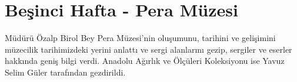 \section{Beşinci Hafta - Pera Müzesi}
\indent\indent Müdürü Özalp Birol Bey Pera Müzesi'nin oluşumunu, tarihini ve gelişimini müzecilik tarihimizdeki yerini anlattı ve sergi alanlarını gezip, sergiler ve eserler hakkında geniş bilgi verdi. Anadolu Ağırlık ve Ölçüleri Koleksiyonu ise Yavuz Selim Güler tarafından gezdirildi.



